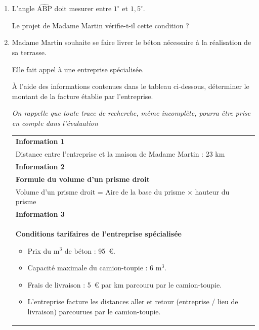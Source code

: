 \begin{enumerate}
	\item L'angle $ \widehat{\text{ABP}} $ doit mesurer entre $1^{\circ}$ et $1,5^{\circ}$.
	
	Le projet de Madame Martin vérifie-t-il cette condition ?
	
	\item Madame Martin souhaite se faire livrer le béton nécessaire à la réalisation de sa terrasse.
	
	Elle fait appel à une entreprise spécialisée.
	
	\smallskip
	
	À l'aide des informations contenues dans le tableau ci-dessous, déterminer le montant de la facture établie par l'entreprise.
	
	\medskip
	\textit{On rappelle que toute trace de recherche, même incomplète, pourra être prise en compte dans l'évaluation}
	
	\begin{tabularx}{\linewidth}{|>{\centering \arraybackslash}X|} \hline
		\textbf{Information 1}\\
		Distance entre l'entreprise et la maison de Madame Martin : 23 km\\ \hline
		\textbf{Information 2}\\
		\textbf{Formule du volume d'un prisme droit}\\
		Volume d'un prisme droit = Aire de la base du prisme $\times$ hauteur du prisme \\ \hline
		\textbf{Information 3}\\
		\textbf{Conditions tarifaires de l'entreprise spécialisée}
			\begin{itemize}
				\item Prix du m$^3$ de béton : 95~\euro{}.
				\item Capacité maximale du camion-toupie : 6 m$^3$.
				\item Frais de livraison : 5~\euro{} par km parcouru par le camion-toupie.
				\item L'entreprise facture les distances aller et retour (entreprise / lieu de livraison) parcourues par le camion-toupie.
			\end{itemize}\\ \hline
		\end{tabularx}
\end{enumerate}


